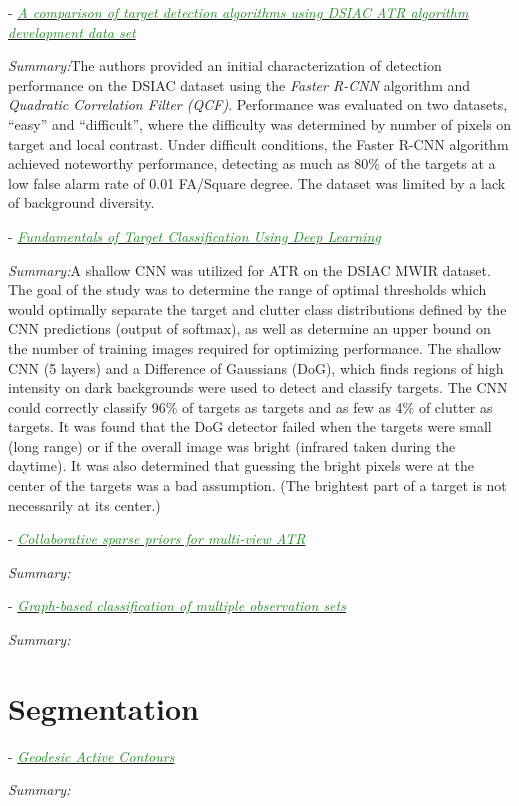 \documentclass[]{article}
\newcommand{\paperentry}[4]{
            \hangindent=1cm
            \cite{#1} - \href{run:../References/#3}{\textcolor{ForestGreen}{\textit{#2}}}
            
            \noindent            
            \begin{minipage}[t]{0.1\linewidth}\hfill\end{minipage}
            \begin{minipage}[t]{0.8\linewidth}\textcolor{NavyBlue}{{\textit{Summary:}}}#4\end{minipage}
            \vspace{.25cm}
          }
\begin{document}
\paperentry{Mahalanobis2019DSIACCharacterization}
{A comparison of target detection algorithms using DSIAC ATR algorithm development data set}
{Army/Mahalanobis2019DSIACCharacterization.pdf}
{The authors provided an initial characterization of detection performance on the DSIAC dataset using the \textit{Faster R-CNN} algorithm and \textit{Quadratic Correlation Filter (QCF)}.  Performance was evaluated on two datasets, ``easy'' and ``difficult'', where the difficulty was determined by number of pixels on target and local contrast.  Under difficult conditions, the Faster R-CNN algorithm achieved noteworthy performance, detecting as much as 80\% of the targets at a low false alarm rate of 0.01 FA/Square degree.  The dataset was limited by a lack of background diversity. }

\paperentry{Tanner2019DSIACNeuralNet}
{Fundamentals of Target Classification Using Deep Learning}
{Army/Tanner2019DSIACNeuralNet.pdf}
{A shallow CNN was utilized for ATR on the DSIAC MWIR dataset.  The goal of the study was to determine the range of optimal thresholds which would optimally separate the target and clutter class distributions defined by the CNN predictions (output of softmax), as well as determine an upper bound on the number of training images required for optimizing performance.  The shallow CNN (5 layers) and a Difference of Gaussians (DoG), which finds regions of high intensity on dark backgrounds were used to detect and classify targets.  The CNN could correctly classify 96\% of targets as targets and as few as 4\% of clutter as targets.  It was found that the DoG detector failed when the targets were small (long range) or if the overall image was bright (infrared taken during the daytime).  It was also determined that guessing the bright pixels were at the center of the targets was a bad assumption. (The brightest part of a target is not necessarily at its center.)}

\paperentry{Li2018CollaborativeSparsePriorsMultiViewATR}
{Collaborative sparse priors for multi-view ATR}
{Army/Li2018CollaborativeSparsePriorsMultiViewATR.pdf}
{}

\paperentry{Kokiopoulou2009GraphBasedClassificationMultipleObsSets}
{Graph-based classification of multiple observation sets}
{Army/Kokiopoulou2009GraphBasedClassificationMultipleObsSets.pdf}
{}


\section{Segmentation}
	\paperentry{Caselles1997GeodesicActiveContours}
	{Geodesic Active Contours}
	{Segmentation/Caselles1997GeodesicActiveContours.pdf}
	{}
	
\end{document}
